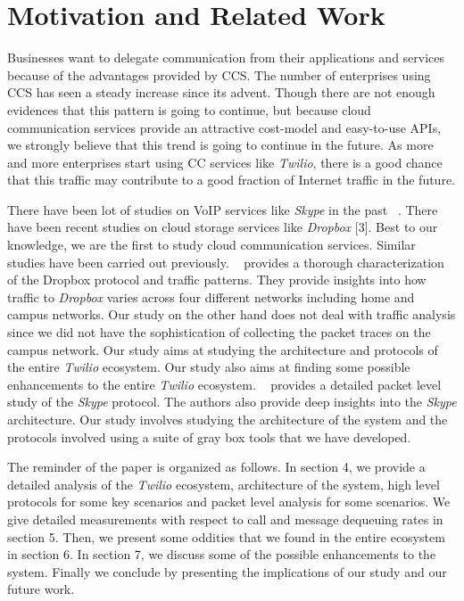 \section{Motivation and Related Work}
\label{sec-motivationandrelated}
Businesses want to delegate communication from their applications and services because of the advantages provided by CCS. The number of enterprises using CCS has seen a steady increase since its advent. Though there are not enough evidences that this pattern is going to continue, but because cloud communication services provide an attractive cost-model and easy-to-use APIs, we strongly believe that this trend is going to continue in the future. As more and more enterprises start using CC services like \textit{Twilio}, there is a good chance that this traffic may contribute to a good fraction of Internet traffic in the future. \par
There have been lot of studies on VoIP services like \textit{Skype} in the past ~\cite{Baset04ananalysis}. There have been recent studies on cloud storage services like \textit{Dropbox} [3]. Best to our knowledge, we are the first to study cloud communication services. Similar studies have been carried out previously. ~\cite{Drago:2012:IDU:2398776.2398827} provides a thorough characterization of the Dropbox protocol and traffic patterns. They provide insights into how traffic to \textit{Dropbox} varies across four different networks including home and campus networks. Our study on the other hand does not deal with traffic analysis since we did not have the sophistication of collecting the packet traces on the campus network. Our study aims at studying the architecture and protocols of the entire \textit{Twilio} ecosystem. Our study also aims at finding some possible enhancements to the entire \textit{Twilio} ecosystem. ~\cite{Baset04ananalysis} provides a detailed packet level study of the \textit{Skype} protocol. The authors also provide deep insights into the \textit{Skype} architecture. Our study involves studying the architecture of the system and the protocols involved using a suite of gray box tools that we have developed. \par
The reminder of the paper is organized as follows. In section 4, we provide a detailed analysis of the \textit{Twilio} ecosystem, architecture of the system, high level protocols for some key scenarios and packet level analysis for some scenarios. We give detailed measurements with respect to call and message dequeuing rates in section 5. Then, we present some oddities that we found in the entire ecosystem in section 6. In section 7, we discuss some of the possible enhancements to the system. Finally we conclude by presenting the implications of our study and our future work.